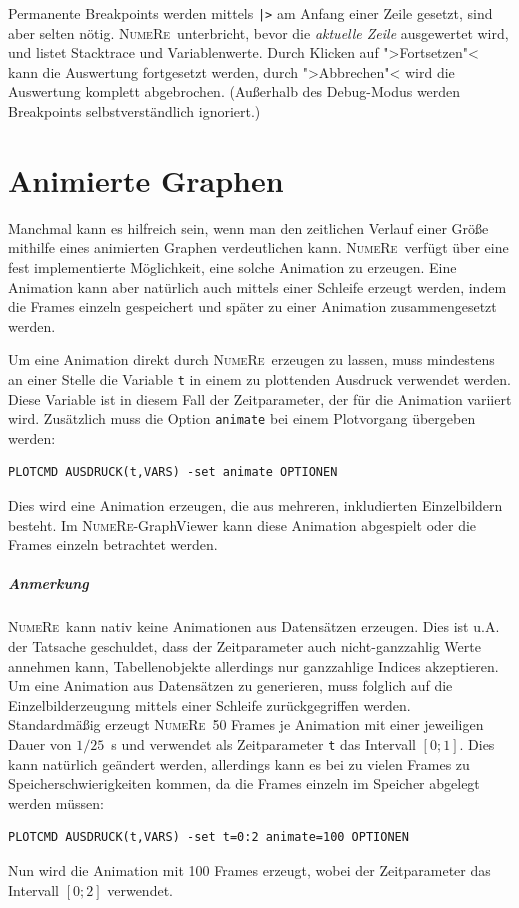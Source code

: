 \documentclass[DIV=14,headsepline,footsepline]{scrbook}
\newcommand{\NR}{\textsc{Nu\-me\-Re}}
\begin{document}
				Permanente Breakpoints werden mittels \lstinline+|>+ am Anfang einer Zeile gesetzt, sind aber selten nötig. \NR\ unterbricht, bevor die \emph{aktuelle Zeile} ausgewertet wird, und listet Stacktrace und Variablenwerte. Durch Klicken auf ">Fortsetzen"< kann die Auswertung fortgesetzt werden, durch ">Abbrechen"< wird die Auswertung komplett abgebrochen. (Außerhalb des Debug-Modus werden Breakpoints selbstverständlich ignoriert.)
				
		\chapter{Animierte Graphen}
			Manchmal kann es hilfreich sein, wenn man den zeitlichen Verlauf einer Größe mithilfe eines animierten Graphen verdeutlichen kann. \NR\ verfügt über eine fest implementierte Möglichkeit, eine solche Animation zu erzeugen. Eine Animation kann aber natürlich auch mittels einer Schleife erzeugt werden, indem die Frames einzeln gespeichert und später zu einer Animation zusammengesetzt werden.
			
			Um eine Animation direkt durch \NR\ erzeugen zu lassen, muss mindestens an einer Stelle die Variable \lstinline+t+ in einem zu plottenden Ausdruck verwendet werden. Diese Variable ist in diesem Fall der Zeitparameter, der für die Animation variiert wird. Zusätzlich muss die Option \lstinline+animate+ bei einem Plotvorgang übergeben werden:
			\begin{lstlisting}
PLOTCMD AUSDRUCK(t,VARS) -set animate OPTIONEN
			\end{lstlisting}
			Dies wird eine Animation erzeugen, die aus mehreren, inkludierten Einzelbildern besteht. Im \NR-GraphViewer kann diese Animation abgespielt oder die Frames einzeln betrachtet werden.
			
			\paragraph{Anmerkung}
				\NR\ kann nativ keine Animationen aus Datensätzen erzeugen. Dies ist u.A. der Tatsache geschuldet, dass der Zeitparameter auch nicht-ganzzahlig Werte annehmen kann, Tabellenobjekte allerdings nur ganzzahlige Indices akzeptieren. Um eine Animation aus Datensätzen zu generieren, muss folglich auf die Einzelbilderzeugung mittels einer Schleife zurückgegriffen werden.\bigskip\\
			Standardmäßig erzeugt \NR\ 50 Frames je Animation mit einer jeweiligen Dauer von $1/25$~s und verwendet als Zeitparameter \lstinline+t+ das Intervall $[0;1]$. Dies kann natürlich geändert werden, allerdings kann es bei zu vielen Frames zu Speicherschwierigkeiten kommen, da die Frames einzeln im Speicher abgelegt werden müssen:
			\begin{lstlisting}
PLOTCMD AUSDRUCK(t,VARS) -set t=0:2 animate=100 OPTIONEN
			\end{lstlisting}
			Nun wird die Animation mit 100 Frames erzeugt, wobei der Zeitparameter das Intervall $[0;2]$ verwendet.
\end{document}
